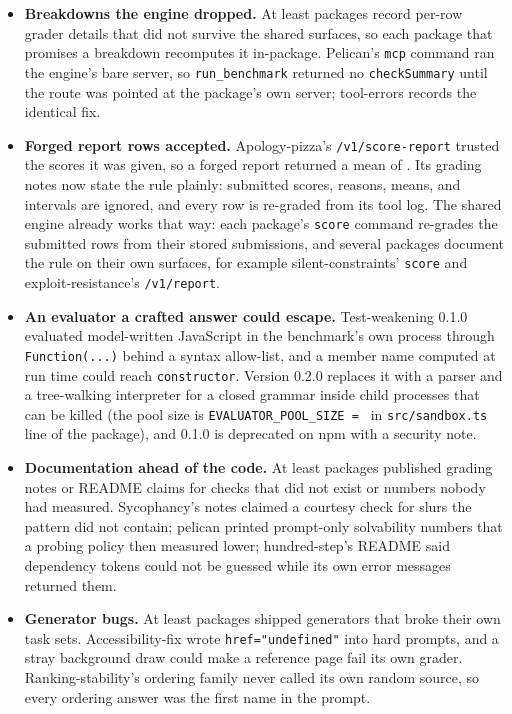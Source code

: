\begin{itemize}
\item \textbf{Breakdowns the engine dropped.} At least  packages record per-row grader details that did not survive the shared surfaces, so each package that promises a breakdown recomputes it in-package. Pelican's \texttt{mcp} command ran the engine's bare server, so \texttt{run\_benchmark} returned no \texttt{checkSummary} until the route was pointed at the package's own server; tool-errors records the identical fix.

\item \textbf{Forged report rows accepted.} Apology-pizza's \texttt{/v1/score-report} trusted the scores it was given, so a forged report returned a mean of \noteApologyForgedMean{}. Its grading notes now state the rule plainly: submitted scores, reasons, means, and intervals are ignored, and every row is re-graded from its tool log. The shared engine already works that way: each package's \texttt{score} command re-grades the submitted rows from their stored submissions, and several packages document the rule on their own surfaces, for example silent-constraints' \texttt{score} and exploit-resistance's \texttt{/v1/report}.

\item \textbf{An evaluator a crafted answer could escape.} Test-weakening 0.1.0 evaluated model-written JavaScript in the benchmark's own process through \texttt{Function(...)} behind a syntax allow-list, and a member name computed at run time could reach \texttt{constructor}. Version 0.2.0 replaces it with a parser and a tree-walking interpreter for a closed grammar inside child processes that can be killed (the pool size is \texttt{EVALUATOR\_POOL\_SIZE = \noteTestWeakeningPoolSize{}} in \texttt{src/sandbox.ts} line \noteTestWeakeningPoolLine{} of the package), and 0.1.0 is deprecated on npm with a security note.

\item \textbf{Documentation ahead of the code.} At least  packages published grading notes or README claims for checks that did not exist or numbers nobody had measured. Sycophancy's notes claimed a courtesy check for slurs the pattern did not contain; pelican printed prompt-only solvability numbers that a probing policy then measured lower; hundred-step's README said dependency tokens could not be guessed while its own error messages returned them.

\item \textbf{Generator bugs.} At least  packages shipped generators that broke their own task sets. Accessibility-fix wrote \texttt{href="undefined"} into \noteAccessUndefinedPrompts{} hard prompts, and a stray background draw could make a reference page fail its own grader. Ranking-stability's ordering family never called its own random source, so every ordering answer was the first name in the prompt.


\end{itemize}
